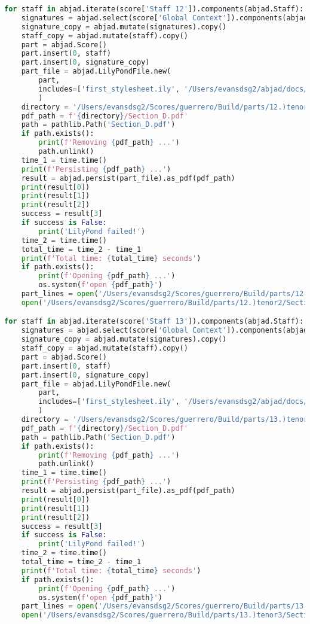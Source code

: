 \begin{lstlisting}[language=Python, caption=Invocation Source Code]
for staff in abjad.iterate(score['Staff 12']).components(abjad.Staff):
    signatures = abjad.select(score['Global Context']).components(abjad.Staff)
    signature_copy = abjad.mutate(signatures).copy()
    staff_copy = abjad.mutate(staff).copy()
    part = abjad.Score()
    part.insert(0, staff)
    part.insert(0, signature_copy)
    part_file = abjad.LilyPondFile.new(
        part,
        includes=['first_stylesheet.ily', '/Users/evansdsg2/abjad/docs/source/_stylesheets/abjad.ily'],
        )
    directory = '/Users/evansdsg2/Scores/guerrero/Build/parts/12.)tenor2'
    pdf_path = f'{directory}/Section_D.pdf'
    path = pathlib.Path('Section_D.pdf')
    if path.exists():
        print(f'Removing {pdf_path} ...')
        path.unlink()
    time_1 = time.time()
    print(f'Persisting {pdf_path} ...')
    result = abjad.persist(part_file).as_pdf(pdf_path)
    print(result[0])
    print(result[1])
    print(result[2])
    success = result[3]
    if success is False:
        print('LilyPond failed!')
    time_2 = time.time()
    total_time = time_2 - time_1
    print(f'Total time: {total_time} seconds')
    if path.exists():
        print(f'Opening {pdf_path} ...')
        os.system(f'open {pdf_path}')
    part_lines = open('/Users/evansdsg2/Scores/guerrero/Build/parts/12.)tenor2/Section_D.ly').readlines()
    open('/Users/evansdsg2/Scores/guerrero/Build/parts/12.)tenor2/Section_D.ly', 'w').writelines(part_lines[15:-1])

for staff in abjad.iterate(score['Staff 13']).components(abjad.Staff):
    signatures = abjad.select(score['Global Context']).components(abjad.Staff)
    signature_copy = abjad.mutate(signatures).copy()
    staff_copy = abjad.mutate(staff).copy()
    part = abjad.Score()
    part.insert(0, staff)
    part.insert(0, signature_copy)
    part_file = abjad.LilyPondFile.new(
        part,
        includes=['first_stylesheet.ily', '/Users/evansdsg2/abjad/docs/source/_stylesheets/abjad.ily'],
        )
    directory = '/Users/evansdsg2/Scores/guerrero/Build/parts/13.)tenor3'
    pdf_path = f'{directory}/Section_D.pdf'
    path = pathlib.Path('Section_D.pdf')
    if path.exists():
        print(f'Removing {pdf_path} ...')
        path.unlink()
    time_1 = time.time()
    print(f'Persisting {pdf_path} ...')
    result = abjad.persist(part_file).as_pdf(pdf_path)
    print(result[0])
    print(result[1])
    print(result[2])
    success = result[3]
    if success is False:
        print('LilyPond failed!')
    time_2 = time.time()
    total_time = time_2 - time_1
    print(f'Total time: {total_time} seconds')
    if path.exists():
        print(f'Opening {pdf_path} ...')
        os.system(f'open {pdf_path}')
    part_lines = open('/Users/evansdsg2/Scores/guerrero/Build/parts/13.)tenor3/Section_D.ly').readlines()
    open('/Users/evansdsg2/Scores/guerrero/Build/parts/13.)tenor3/Section_D.ly', 'w').writelines(part_lines[15:-1])


\end{lstlisting}
